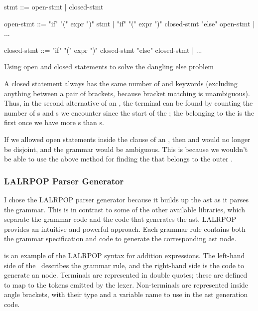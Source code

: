 \documentclass[00-main.tex]{subfiles}
\begin{document}
\begin{listing}[!ht]
  \begin{GrammarListing}
    stmt        ::= open-stmt | closed-stmt

    open-stmt   ::= "if" "(" expr ")" stmt
                  | "if" "(" expr ")" closed-stmt "else" open-stmt
                  | ...

    closed-stmt ::= "if" "(" expr ")" closed-stmt "else" closed-stmt
                  | ...
  \end{GrammarListing}
  \caption{Using open and closed statements to solve the dangling else problem}
  \label{lst:open/closed statement grammar}
\end{listing}

A closed statement always has the same number of  and  keywords (excluding anything between a pair of brackets, because bracket matching is unambiguous).
Thus, in the second alternative of an , the  terminal can be found by counting the number of s and s we encounter since the start of the ; the  belonging to the  is the first  once we have more s than s.

If we allowed open statements inside the  clause of an , then  and  would no longer be disjoint, and the grammar would be ambiguous. This is because we wouldn't be able to use the above method for finding the  that belongs to the outer .

\subsubsection{LALRPOP Parser Generator}

I chose the LALRPOP parser generator because it builds up the \gls{ast} as it parses the grammar.
This is in contrast to some of the other available libraries, which separate the grammar code and the code that generates the \gls{ast}\@.
LALRPOP provides an intuitive and powerful approach.
Each grammar rule contains both the grammar specification and code to generate the corresponding \gls{ast} node.

 is an example of the LALRPOP syntax for addition expressions.
The left-hand side of the~\RustInline{=>} describes the grammar rule, and the right-hand side is the code to generate an  node.
Terminals are represented in double quotes; these are defined to map to the tokens emitted by the lexer.
Non-terminals are represented inside angle brackets, with their type and a variable name to use in the \gls{ast} generation code.
\end{document}
